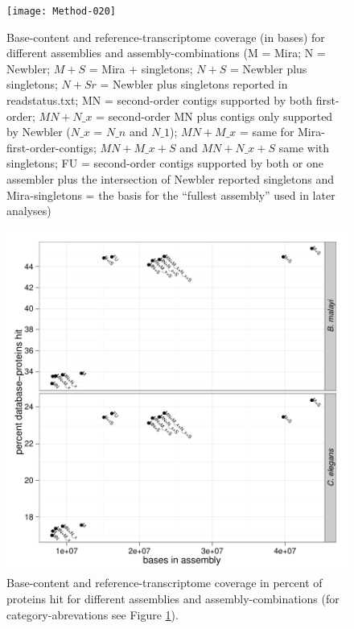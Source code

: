 \documentclass[12pt,a4paper]{article}
\begin{document}
\begin{figure}[H]

\texttt{[image: Method-020]}
\caption{Base-content and reference-transcriptome coverage (in bases)
  for different assemblies and assembly-combinations (M = Mira; N =
  Newbler; $M+S$ = Mira + singletons; $N+S$ = Newbler plus singletons;
  $N+Sr$ = Newbler plus singletons reported in readstatus.txt; MN =
  second-order contigs supported by both first-order; $MN+N\_x$ =
  second-order MN plus contigs only supported by Newbler ($N\_x$ =
  $N\_n$ and $N\_1$); $MN+M\_x$ = same for Mira-first-order-contigs;
  $MN+M\_x+S$ and $MN+N\_x+S$ same with singletons; FU = second-order
  contigs supported by both or one assembler plus the intersection of
  Newbler reported singletons and Mira-singletons = the basis for the
  ``fullest assembly'' used in later analyses)}
\label{fig:basecov}
\end{figure}


\begin{figure}[H]

\includegraphics{Method-021}
\caption{Base-content and reference-transcriptome coverage in percent
  of proteins hit for different assemblies and assembly-combinations
  (for category-abrevations see Figure \ref{fig:basecov}).}
\label{fig:protcov}
\end{figure}
\end{document}
